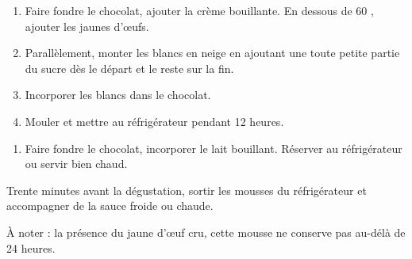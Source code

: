 

\begin{ingredients}
\end{ingredients}


\begin{recipe}
  \begin{enumerate}

  \item Faire fondre le chocolat, ajouter la crème bouillante.  En
    dessous de 60 \degreeC, ajouter les jaunes d'œufs.

  \item Parallèlement, monter les blancs en neige en ajoutant une
    toute petite partie du sucre dès le départ et le reste sur la fin.

  \item Incorporer les blancs dans le chocolat.

  \item Mouler et mettre au réfrigérateur pendant 12 heures.

  \end{enumerate}
\end{recipe}


\begin{ingredients}
\end{ingredients}

\begin{recipe}
  \begin{enumerate}

  \item Faire fondre le chocolat, incorporer le lait bouillant.
    Réserver au réfrigérateur ou servir bien chaud.

  \end{enumerate}
\end{recipe}


Trente minutes avant la dégustation, sortir les mousses du
réfrigérateur et accompagner de la sauce froide ou chaude.

À noter : la présence du jaune d'œuf cru, cette mousse ne conserve
pas au-délà de 24 heures.

